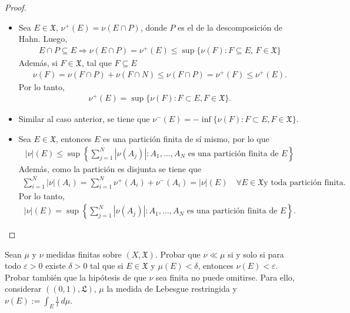 \documentclass[12pt]{article}
\newenvironment{statement}[2][Ejercicio]{\begin{trivlist}
\item[\hskip \labelsep {\bfseries #1}\hskip \labelsep {\bfseries #2.}]}{\end{trivlist}}
\begin{document}
\begin{proof}
    \begin{itemize}
        \item[(a)] Sea $E \in \mathfrak{X}$, $\nu^+(E) = \nu(E \cap P)$, donde $P$ es el de la descomposición de Hahn. Luego, \begin{align*}
                  E \cap P \subseteq E \Rightarrow \nu(E \cap P) = \nu^+(E) \leq \sup \{ \nu(F) : F \subseteq E \text{, } F \in \mathfrak{X} \}
              \end{align*} Además, si $F \in \mathfrak{X}$, tal que $F \subseteq E$ \begin{align*}
                  \nu(F) = \nu(F \cap P) + \nu(F \cap N) \leq \nu(F \cap P) = \nu^+(F) \leq \nu^+(E).
              \end{align*} Por lo tanto, \begin{align*}
                  \nu^+(E) = \sup\{\nu(F) : F \subset E, F \in \mathfrak{X}\}.
              \end{align*}
        \item[(b)] Similar al caso anterior, se tiene que $\nu^-(E) = -\inf\{\nu(F) : F \subset E, F \in \mathfrak{X}\}$.
        \item[(c)] Sea $E \in \mathfrak{X}$, entonces $E$ es una partición finita de sí mismo, por lo que \begin{align*}
                  |\nu|(E) \leq \sup\left\{\sum_{j=1}^{N} |\nu(A_j)| : A_1, \ldots, A_N \text{ es una partición finita de } E \right\}
              \end{align*} Además, como la partición es disjunta se tiene que \begin{align*}
                  \sum_{i = 1}^N|\nu|(A_i) = \sum_{i = 1}^N \nu^+(A_i) + \nu^-(A_i) = |\nu|(E) \quad \forall E \in \mathfrak{X} \text{y toda partición finita}.
              \end{align*} Por lo tanto, \begin{align*}
                  |\nu|(E) = \sup\left\{\sum_{j=1}^{N} |\nu(A_j)| : A_1, \ldots, A_N \text{ es una partición finita de } E \right\}.
              \end{align*}
    \end{itemize}
\end{proof}

\begin{statement}{2}
    Sean $\mu$ y $\nu$ medidas finitas sobre $(X, \mathfrak{X})$. Probar que $\nu \ll \mu$ si y solo si para todo $\varepsilon > 0$ existe $\delta > 0$ tal que si $E \in \mathfrak{X}$ y $\mu(E) < \delta$, entonces $\nu(E) < \varepsilon$. \\
    Probar también que la hipótesis de que $\nu$ sea finita no puede omitirse. Para ello, considerar $((0,1), \mathfrak{L})$, $\mu$ la medida de Lebesgue restringida y $\nu(E) := \int_E \frac{1}{t} \, d\mu$.
\end{statement}
\end{document}
